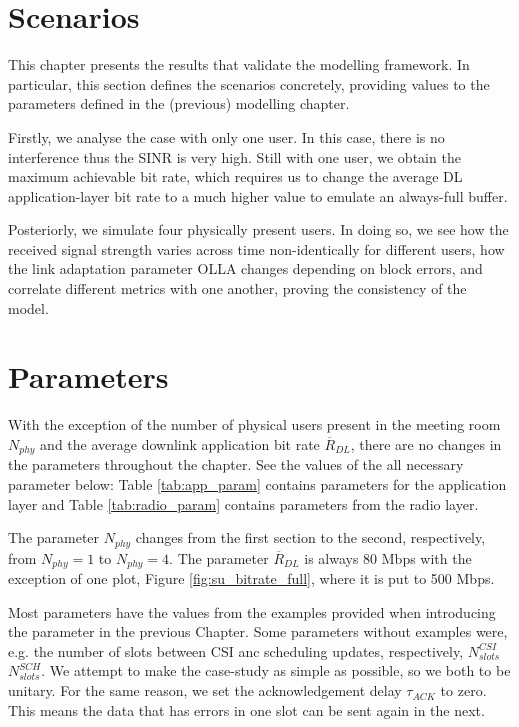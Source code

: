 \section{Scenarios}
\label{sec:scenarios}

This chapter presents the results that validate the modelling framework. In particular, this section defines the scenarios concretely, providing values to the parameters defined in the (previous) modelling chapter. 

Firstly, we analyse the case with only one user. In this case, there is no interference thus the \acs{SINR} is very high. Still with one user, we obtain the maximum achievable bit rate, which requires us to change the average DL application-layer bit rate to a much higher value to emulate an always-full buffer. 

Posteriorly, we simulate four physically present users. In doing so, we see how the received signal strength varies across time non-identically for different users, how the link adaptation parameter \acs{OLLA} changes depending on block errors, and correlate different metrics with one another, proving the consistency of the model.

\section*{Parameters}

With the exception of the number of physical users present in the meeting room $N_{phy}$ and the average downlink application bit rate $\overline{R}_{DL}$, there are no changes in the parameters throughout the chapter. See the values of the all necessary parameter below: Table \ref{tab:app_param} contains parameters for the application layer and Table \ref{tab:radio_param} contains parameters from the radio layer. 

The parameter $N_{phy}$ changes from the first section to the second, respectively, from $N_{phy} = 1$ to $N_{phy} = 4$. The parameter $\overline{R}_{DL}$ is always 80 Mbps with the exception of one plot, Figure \ref{fig:su_bitrate_full}, where it is put to 500 Mbps. 

Most parameters have the values from the examples provided when introducing the parameter in the previous Chapter. Some parameters without examples were, e.g. the number of slots between CSI anc scheduling updates, respectively, $N_{slots}^{CSI}$ $N_{slots}^{SCH}$. We attempt to make the case-study as simple as possible, so we both to be unitary. For the same reason, we set the acknowledgement delay $\tau_{ACK}$ to zero. This means the data that has errors in one slot can be sent again in the next. 

